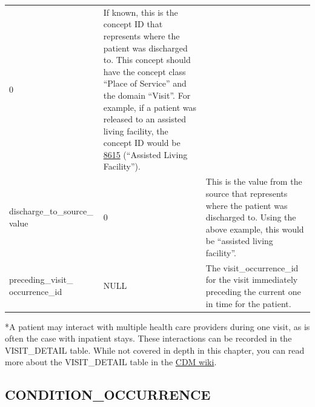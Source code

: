 \documentclass[11pt]{book}
\theoremstyle{definition}
\theoremstyle{definition}
\theoremstyle{definition}
\theoremstyle{remark}
\begin{document}
\begin{longtable}[]{@{}lll@{}}
\begin{minipage}[t]{0.15\columnwidth}
0\strut
\end{minipage} & \begin{minipage}[t]{0.49\columnwidth}\raggedright
If known, this is the concept ID that represents where the patient was discharged to. This concept should have the concept class ``Place of Service'' and the domain ``Visit''. For example, if a patient was released to an assisted living facility, the concept ID would be \href{http://athena.ohdsi.org/search-terms/terms/8615}{8615} (``Assisted Living Facility'').\strut
\end{minipage}\tabularnewline
\begin{minipage}[t]{0.28\columnwidth}\raggedright
discharge\_to\_source\_ value\strut
\end{minipage} & \begin{minipage}[t]{0.15\columnwidth}\raggedright
0\strut
\end{minipage} & \begin{minipage}[t]{0.49\columnwidth}\raggedright
This is the value from the source that represents where the patient was discharged to. Using the above example, this would be ``assisted living facility''.\strut
\end{minipage}\tabularnewline
\begin{minipage}[t]{0.28\columnwidth}\raggedright
preceding\_visit\_ occurrence\_id\strut
\end{minipage} & \begin{minipage}[t]{0.15\columnwidth}\raggedright
NULL\strut
\end{minipage} & \begin{minipage}[t]{0.49\columnwidth}\raggedright
The visit\_occurrence\_id for the visit immediately preceding the current one in time for the patient.\strut
\end{minipage}\tabularnewline
\bottomrule
\end{longtable}

*A patient may interact with multiple health care providers during one visit, as is often the case with inpatient stays. These interactions can be recorded in the VISIT\_DETAIL table. While not covered in depth in this chapter, you can read more about the VISIT\_DETAIL table in the \href{https://github.com/OHDSI/CommonDataModel/wiki/VISIT_DETAIL}{CDM wiki}.

\hypertarget{conditionOccurrence}{%
\subsection{CONDITION\_OCCURRENCE}\label{conditionOccurrence}}
\end{document}
